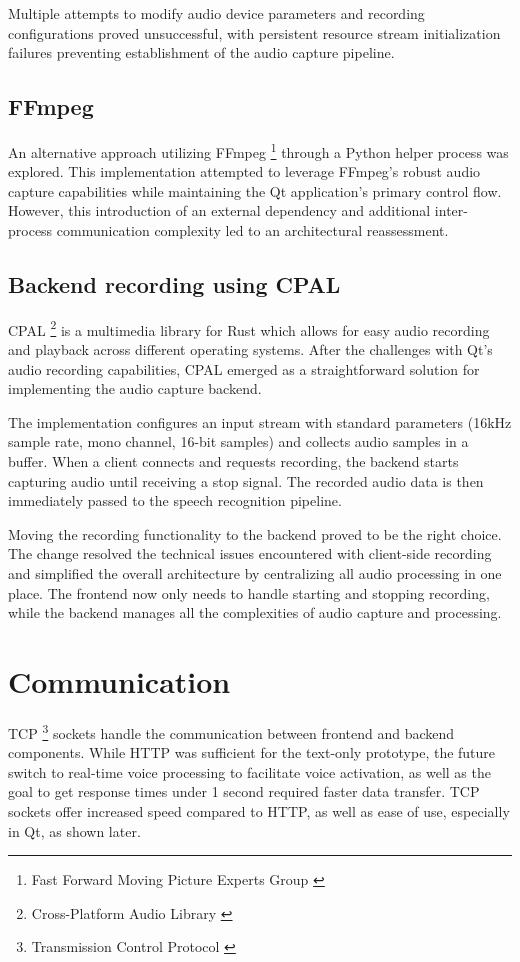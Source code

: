 Multiple attempts to modify audio device parameters
and recording configurations proved unsuccessful,
with persistent resource stream initialization failures
preventing establishment of the audio capture pipeline.

\subsection{FFmpeg}
An alternative approach utilizing FFmpeg \footnote{Fast Forward Moving Picture Experts Group \cite{ffmpeg}} through a Python helper process was explored.
This implementation attempted to leverage FFmpeg's robust audio capture capabilities
while maintaining the Qt application's primary control flow.
However, this introduction of an external dependency
and additional inter-process communication complexity
led to an architectural reassessment.

\subsection{Backend recording using CPAL}
CPAL \footnote{Cross-Platform Audio Library \cite{cpal}} is a multimedia library for Rust
which allows for easy audio recording and playback across different operating systems.
After the challenges with Qt's audio recording capabilities,
CPAL emerged as a straightforward solution for implementing the audio capture backend.

The implementation configures an input stream with standard parameters
(16kHz sample rate, mono channel, 16-bit samples) and collects audio samples
in a buffer. When a client connects and requests recording, the backend
starts capturing audio until receiving a stop signal. The recorded audio
data is then immediately passed to the speech recognition pipeline.

Moving the recording functionality to the backend proved to be the right choice.
The change resolved the technical issues encountered with client-side recording
and simplified the overall architecture by centralizing all audio processing
in one place. The frontend now only needs to handle starting and stopping recording,
while the backend manages all the complexities of audio capture and processing.

\section{Communication}
TCP \footnote{Transmission Control Protocol \cite{tcp}} sockets handle the communication between frontend and backend components.
While HTTP was sufficient for the text-only prototype, the future switch to real-time
voice processing to facilitate voice activation, as well as the goal to get response times
under 1 second required faster data transfer. TCP sockets offer increased speed compared to
HTTP, as well as ease of use, especially in Qt, as shown later.

